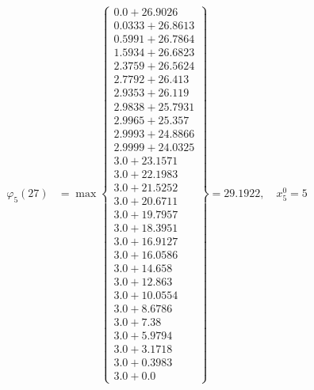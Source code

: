 \documentclass{article}
\begin{document}
\begin{align*}
\varphi_{5}(27) &= \max \left\{ \begin{array}{c}
0.0 + 26.9026 \\
 0.0333 + 26.8613 \\
 0.5991 + 26.7864 \\
 1.5934 + 26.6823 \\
 2.3759 + 26.5624 \\
 2.7792 + 26.413 \\
 2.9353 + 26.119 \\
 2.9838 + 25.7931 \\
 2.9965 + 25.357 \\
 2.9993 + 24.8866 \\
 2.9999 + 24.0325 \\
 3.0 + 23.1571 \\
 3.0 + 22.1983 \\
 3.0 + 21.5252 \\
 3.0 + 20.6711 \\
 3.0 + 19.7957 \\
 3.0 + 18.3951 \\
 3.0 + 16.9127 \\
 3.0 + 16.0586 \\
 3.0 + 14.658 \\
 3.0 + 12.863 \\
 3.0 + 10.0554 \\
 3.0 + 8.6786 \\
 3.0 + 7.38 \\
 3.0 + 5.9794 \\
 3.0 + 3.1718 \\
 3.0 + 0.3983 \\
 3.0 + 0.0
\end{array} \right\}=29.1922, \quad x_{5}^0=5\\
  

\end{align*}
\end{document}
